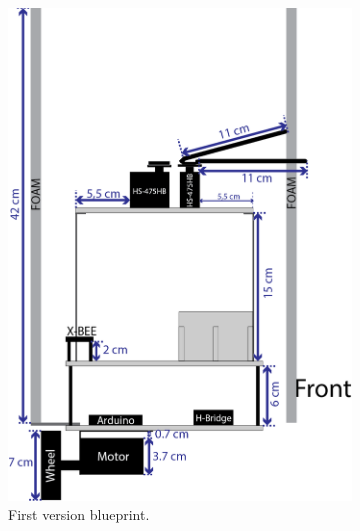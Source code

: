 \begin{figure}[h]
\begin{subfigure}[c]{0.3\textwidth}
	\includegraphics[width=\textwidth]{./Images/upperSecondC.png}
	\caption{First version blueprint.}
	\label{fig:triskar-first-design}
	\end{subfigure}
	\begin{subfigure}[c]{0.3\textwidth}
	\centering

\end{subfigure}
\end{figure}
